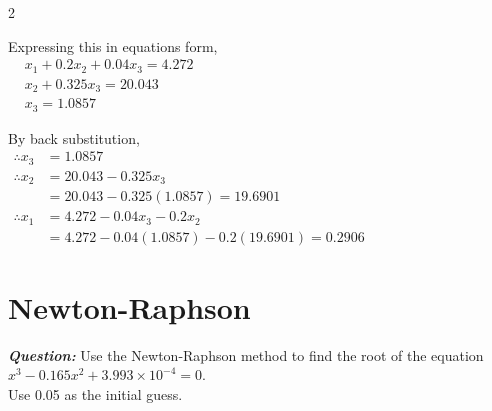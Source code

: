 \begin{multicols}{2}
\columnbreak

Expressing this in equations form,\\[0.2em]
$\begin{aligned}
   & x_1 + 0.2x_2 + 0.04x_3 = 4.272 \\
   & x_2 + 0.325x_3 = 20.043 \\
   & x_3 = 1.0857
\end{aligned}$

\vspace{1em}

By back substitution,\\[0.2em]
$\begin{aligned}
   \therefore x_3 &= 1.0857
   \\[1em]
   \therefore x_2 &= 20.043 - 0.325x_3\\
   &= 20.043 - 0.325(1.0857) = 19.6901
   \\[1em]
   \therefore x_1 &= 4.272 - 0.04x_3 - 0.2x_2\\
   &= 4.272 - 0.04(1.0857) - 0.2(19.6901) = 0.2906
\end{aligned}$
\end{multicols}


\pagebreak
\section*{Newton-Raphson}
\textbf{\textit{Question:}}
Use the Newton-Raphson method to find the root of the equation $x^3 - 0.165x^2 + 3.993 \times 10^{-4} = 0$.\\
Use 0.05 as the initial guess.

